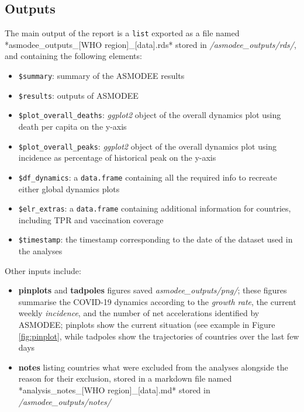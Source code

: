 \documentclass[]{book}
\providecommand{\tightlist}{%
  \setlength{\itemsep}{0pt}\setlength{\parskip}{0pt}}
\begin{document}
\hypertarget{outputs-1}{%
\subsection{Outputs}\label{outputs-1}}

The main output of the report is a \texttt{list} exported as a file named
*asmodee\_outputs\_{[}WHO region{]}\_{[}data{]}.rds* stored in \emph{/asmodee\_outputs/rds/}, and
containing the following elements:

\begin{itemize}
\tightlist
\item
  \texttt{\$summary}: summary of the ASMODEE results
\item
  \texttt{\$results}: outputs of ASMODEE
\item
  \texttt{\$plot\_overall\_deaths}: \emph{ggplot2} object of the overall dynamics plot using
  death per capita on the y-axis
\item
  \texttt{\$plot\_overall\_peaks}: \emph{ggplot2} object of the overall dynamics plot using
  incidence as percentage of historical peak on the y-axis
\item
  \texttt{\$df\_dynamics}: a \texttt{data.frame} containing all the required info to recreate
  either global dynamics plots
\item
  \texttt{\$elr\_extras}: a \texttt{data.frame} containing additional information for countries,
  including TPR and vaccination coverage
\item
  \texttt{\$timestamp}: the timestamp corresponding to the date of the dataset used in
  the analyses
\end{itemize}

Other inputs include:

\begin{itemize}
\item
  \textbf{pinplots} and \textbf{tadpoles} figures saved \emph{asmodee\_outputs/png/}; these
  figures summarise the COVID-19 dynamics according to the \emph{growth rate}, the
  current weekly \emph{incidence}, and the number of net accelerations identified by
  ASMODEE; pinplots show the current situation (see example in Figure
  \ref{fig:pinplot}, while tadpoles show the trajectories of countries over the
  last few days
\item
  \textbf{notes} listing countries what were excluded from the analyses alongside the
  reason for their exclusion, stored in a markdown file named *analysis\_notes\_{[}WHO
  region{]}\_{[}data{]}.md* stored in \emph{/asmodee\_outputs/notes/}
\end{itemize}
\end{document}
